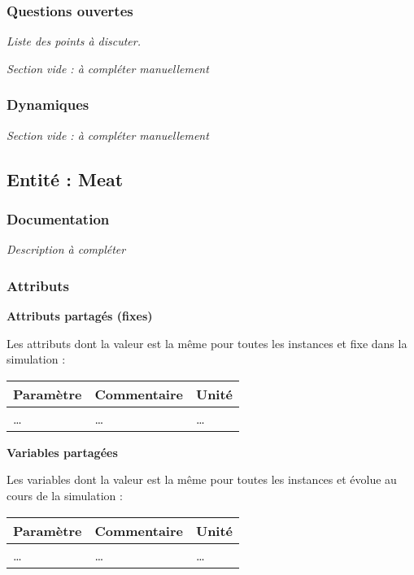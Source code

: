 \documentclass[
]{article}
\begin{document}
\subsubsection{Questions ouvertes}\label{questions-ouvertes-6}

\emph{Liste des points à discuter.}

\emph{Section vide : à compléter manuellement}

\subsubsection{Dynamiques}\label{dynamiques-6}

\emph{Section vide : à compléter manuellement}

\subsection{Entité : Meat}\label{entituxe9-meat}

\subsubsection{Documentation}\label{documentation-11}

\emph{Description à compléter}

\subsubsection{Attributs}\label{attributs-11}

\textbf{Attributs partagés (fixes)}

Les attributs dont la valeur est la même pour toutes les instances et
fixe dans la simulation :

\begin{longtable}[]{@{}lll@{}}
\toprule\noalign{}
\textbf{Paramètre} & \textbf{Commentaire} & \textbf{Unité} \\
\midrule\noalign{}
\endhead
\bottomrule\noalign{}
\endlastfoot
\ldots{} & \ldots{} & \ldots{} \\
\end{longtable}

\textbf{Variables partagées}

Les variables dont la valeur est la même pour toutes les instances et
évolue au cours de la simulation :

\begin{longtable}[]{@{}lll@{}}
\toprule\noalign{}
\textbf{Paramètre} & \textbf{Commentaire} & \textbf{Unité} \\
\midrule\noalign{}
\endhead
\bottomrule\noalign{}
\endlastfoot
\ldots{} & \ldots{} & \ldots{} \\
\end{longtable}
\end{document}
